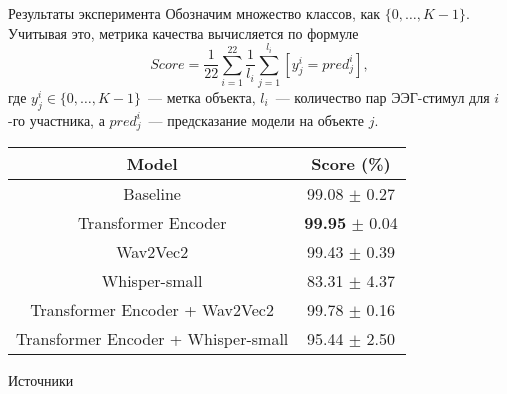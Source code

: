 \documentclass{beamer}
\begin{document}
\begin{frame}{Результаты эксперимента}
Обозначим множество классов, как $\{0, \dots, K-1\}$. Учитывая это, метрика качества вычисляется по формуле
$$
    Score = \frac{1}{22} \sum_{i=1}^{22} \frac{1}{l_i} \sum_{j=1}^{l_i} \left[ y^i_j = pred^i_j\right],
$$
где $y^i_j \in \{0, \dots, K-1\}$~--- метка объекта, $l_i$~--- количество пар ЭЭГ-стимул для $i$-го участника, а $pred^i_j$~--- предсказание модели на объекте $j$.
\begin{table}[h]
    \centering
    \begin{tabular}{|c|c|} \hline 
        Model & Score (\%) \\ \hline
        Baseline & 99.08 $\pm$ 0.27 \\ 
        Transformer Encoder & \textbf{99.95} $\pm$ 0.04 \\ 
        Wav2Vec2 & 99.43 $\pm$ 0.39 \\   
        Whisper-small & 83.31 $\pm$ 4.37 \\   
        Transformer Encoder + Wav2Vec2 & 99.78 $\pm$ 0.16 \\ 
        Transformer Encoder + Whisper-small & 95.44 $\pm$ 2.50\\ \hline
    \end{tabular}
    \label{results}
\end{table}

\end{frame}
\begin{frame}{Источники}
    
    
\end{frame}
\end{document}
